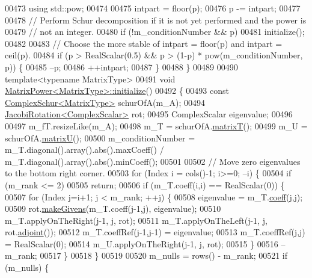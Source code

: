 \begin{DoxyCode}
00473   \textcolor{keyword}{using} std::pow;
00474 
00475   intpart = floor(p);
00476   p -= intpart;
00477 
00478   \textcolor{comment}{// Perform Schur decomposition if it is not yet performed and the power is}
00479   \textcolor{comment}{// not an integer.}
00480   \textcolor{keywordflow}{if} (!m\_conditionNumber && p)
00481     initialize();
00482 
00483   \textcolor{comment}{// Choose the more stable of intpart = floor(p) and intpart = ceil(p).}
00484   \textcolor{keywordflow}{if} (p > RealScalar(0.5) && p > (1-p) * pow(m\_conditionNumber, p)) \{
00485     --p;
00486     ++intpart;
00487   \}
00488 \}
00489 
00490 \textcolor{keyword}{template}<\textcolor{keyword}{typename} MatrixType>
00491 \textcolor{keywordtype}{void} \hyperlink{class_eigen_1_1_matrix_power}{MatrixPower<MatrixType>::initialize}()
00492 \{
00493   \textcolor{keyword}{const} \hyperlink{group___eigenvalues___module}{ComplexSchur<MatrixType>} schurOfA(m\_A);
00494   \hyperlink{group___jacobi___module_class_eigen_1_1_jacobi_rotation}{JacobiRotation<ComplexScalar>} rot;
00495   ComplexScalar eigenvalue;
00496 
00497   m\_fT.resizeLike(m\_A);
00498   m\_T = schurOfA.\hyperlink{group___eigenvalues___module_add3ab5ed83f7f2f06b79fa910a2d5684}{matrixT}();
00499   m\_U = schurOfA.\hyperlink{group___eigenvalues___module_afed8177cf9836f032d42bdb6c6bc6e01}{matrixU}();
00500   m\_conditionNumber = m\_T.diagonal().array().abs().maxCoeff() / m\_T.diagonal().array().abs().minCoeff();
00501 
00502   \textcolor{comment}{// Move zero eigenvalues to the bottom right corner.}
00503   \textcolor{keywordflow}{for} (Index i = cols()-1; i>=0; --i) \{
00504     \textcolor{keywordflow}{if} (m\_rank <= 2)
00505       \textcolor{keywordflow}{return};
00506     \textcolor{keywordflow}{if} (m\_T.coeff(i,i) == RealScalar(0)) \{
00507       \textcolor{keywordflow}{for} (Index j=i+1; j < m\_rank; ++j) \{
00508         eigenvalue = m\_T.\hyperlink{class_eigen_1_1_plain_object_base_afbfc12954f16d21aedb7bd839f64a278}{coeff}(j,j);
00509         rot.\hyperlink{group___jacobi___module_af73c81e9cc139b7e0d877ce553b02ec0}{makeGivens}(m\_T.coeff(j-1,j), eigenvalue);
00510         m\_T.applyOnTheRight(j-1, j, rot);
00511         m\_T.applyOnTheLeft(j-1, j, rot.\hyperlink{group___jacobi___module_a89c8ea615f8fa77ddd5810a1e5fde4da}{adjoint}());
00512         m\_T.coeffRef(j-1,j-1) = eigenvalue;
00513         m\_T.coeffRef(j,j) = RealScalar(0);
00514         m\_U.applyOnTheRight(j-1, j, rot);
00515       \}
00516       --m\_rank;
00517     \}
00518   \}
00519 
00520   m\_nulls = rows() - m\_rank;
00521   \textcolor{keywordflow}{if} (m\_nulls) \{

\end{DoxyCode}
